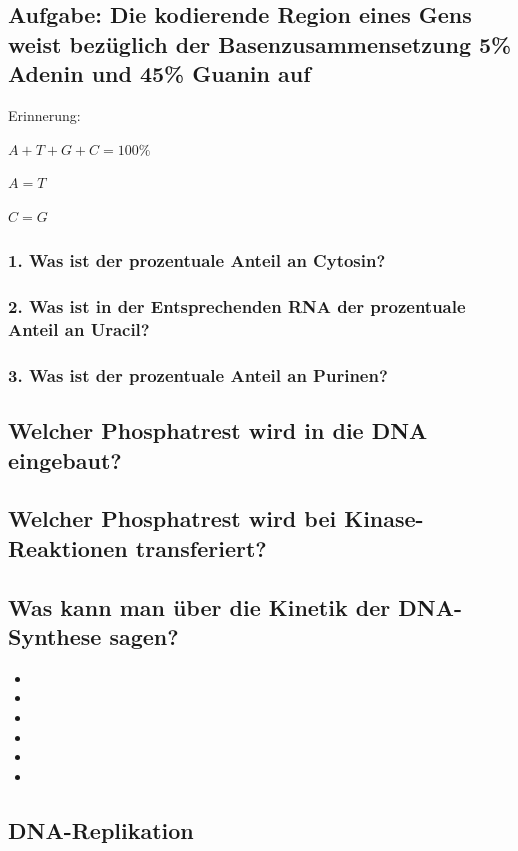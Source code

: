 \documentclass{article}
\begin{document}
\subsection*{Aufgabe: Die kodierende Region eines Gens weist bezüglich der Basenzusammensetzung 5\% Adenin und 45\% Guanin auf}
Erinnerung: \newline
\centerline{$A+T+G+C=100\%$}
\centerline{$A = T$}
\centerline{$C = G$}
\subsubsection*{1. Was ist der prozentuale Anteil an Cytosin?}
\bigskip\bigskip
\subsubsection*{2. Was ist in der Entsprechenden RNA der prozentuale Anteil an Uracil?} 
\bigskip\bigskip
\subsubsection*{3. Was ist der prozentuale Anteil an Purinen? } 
\bigskip\bigskip\bigskip\bigskip\bigskip\bigskip


\subsection*{Welcher Phosphatrest wird in die DNA eingebaut?}
\bigskip\bigskip\bigskip\bigskip


\subsection*{Welcher Phosphatrest wird bei Kinase-Reaktionen transferiert?}
\bigskip\bigskip\bigskip\bigskip

 
\subsection*{Was kann man über die Kinetik der DNA-Synthese sagen?}
\begin{itemize}
    \item 
    \item 
    \item 
    \item 
    \item 
    \item
\end{itemize} 

\subsection*{DNA-Replikation}
\end{document}
